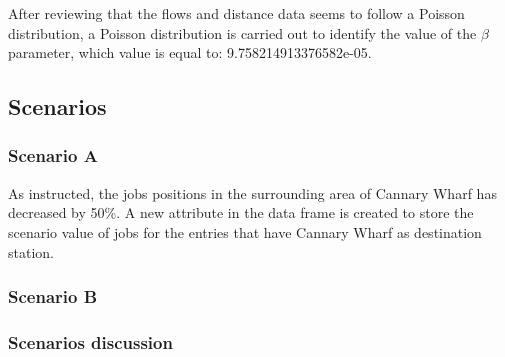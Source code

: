 \documentclass{article}
\begin{document}
After reviewing that the flows and distance data seems to follow a Poisson distribution, a Poisson distribution is carried out to identify the value of the  $\beta$ parameter, which value is equal to: 9.758214913376582e-05.

\subsection{Scenarios}



\subsubsection{Scenario A}

As instructed, the jobs positions in the surrounding area of Cannary Wharf has decreased by 50\%. A new attribute in the data frame is created to store the scenario value of jobs for the entries that have Cannary Wharf as destination station. 

\subsubsection{Scenario B}

\subsubsection{Scenarios discussion}




\end{document}
